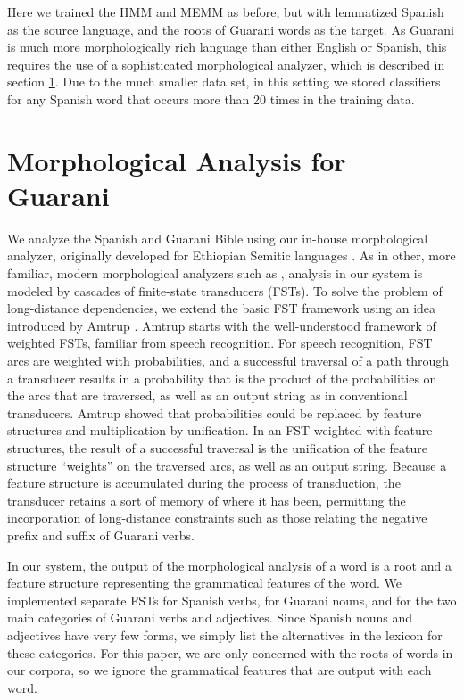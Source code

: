 \documentclass[11pt]{article}
\begin{document}
Here we trained the HMM and MEMM as before, but with lemmatized Spanish as the
source language, and the roots of Guarani words as the target.  As Guarani is
much more morphologically rich language than either English or Spanish, this
requires the use of a sophisticated morphological analyzer, which is described
in section \ref{sec:guaranima}. Due to the much smaller data set, in this
setting we stored classifiers for any Spanish word that occurs more than 20
times in the training data.

\section{Morphological Analysis for Guarani}
\label{sec:guaranima}
We analyze the Spanish and Guarani Bible using our in-house morphological
analyzer, originally developed for Ethiopian Semitic languages 
\cite{gasser:eacl09}.
As in other, more familiar, modern
morphological analyzers such as \cite{beesley+karttunen}, analysis in our
system is modeled by cascades of finite-state transducers (FSTs).  To solve the
problem of long-distance dependencies, we extend the basic FST framework using
an idea introduced by Amtrup .  Amtrup starts with the
well-understood framework of weighted FSTs, familiar from speech recognition.
For speech recognition, FST arcs are weighted with probabilities, and a
successful traversal of a path through a transducer results in a probability
that is the product of the probabilities on the arcs that are traversed, as
well as an output string as in conventional transducers.  Amtrup showed that
probabilities could be replaced by feature structures and multiplication by
unification.  In an FST weighted with feature structures, the result of a
successful traversal is the unification of the feature structure ``weights'' on
the traversed arcs, as well as an output string.  Because a feature structure
is accumulated during the process of transduction, the transducer retains a
sort of memory of where it has been, permitting the incorporation of
long-distance constraints such as those relating the negative prefix and suffix
of Guarani verbs.

In our system, the output of the morphological analysis of a word is a root and
a feature structure representing the grammatical features of the word.  We
implemented separate FSTs for Spanish verbs, for Guarani nouns, and for the two
main categories of Guarani verbs and adjectives.  Since Spanish nouns and
adjectives have very few forms, we simply list the alternatives in the lexicon
for these categories.  For this paper, we are only concerned with the roots of
words in our corpora, so we ignore the grammatical features that are output
with each word.
\end{document}
